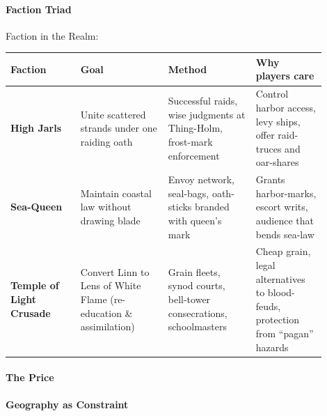 \paragraph{Faction Triad}
Faction in the Realm:
\begin{tabular}{|p{0.2\linewidth}|p{0.25\linewidth}|p{0.25\linewidth}|p{0.2\linewidth}|}
\hline
\textbf{Faction} & \textbf{Goal} & \textbf{Method} & \textbf{Why players care} \\
\hline
\textbf{High Jarls} & Unite scattered strands under one raiding oath & Successful raids, wise judgments at Thing-Holm, frost-mark enforcement & Control harbor access, levy ships, offer raid-truces and oar-shares \\
\hline
\textbf{Sea-Queen} & Maintain coastal law without drawing blade & Envoy network, seal-bags, oath-sticks branded with queen's mark & Grants harbor-marks, escort writs, audience that bends sea-law \\
\hline
\textbf{Temple of Light Crusade} & Convert Linn to Lens of White Flame (re-education \& assimilation) & Grain fleets, synod courts, bell-tower consecrations, schoolmasters & Cheap grain, legal alternatives to blood-feuds, protection from ``pagan'' hazards \\
\hline
\end{tabular}

\paragraph{The Price}

\paragraph{Geography as Constraint}

